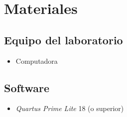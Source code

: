 \documentclass[../main.tex]{subfiles}
\begin{document}
\section{Materiales}
\subsection*{Equipo del laboratorio}
\begin{itemize}
  \item Computadora
\end{itemize}
\subsection*{Software}
\begin{itemize}
  \item \textit{Quartus Prime Lite} 18 (o superior)
\end{itemize}
\end{document}

